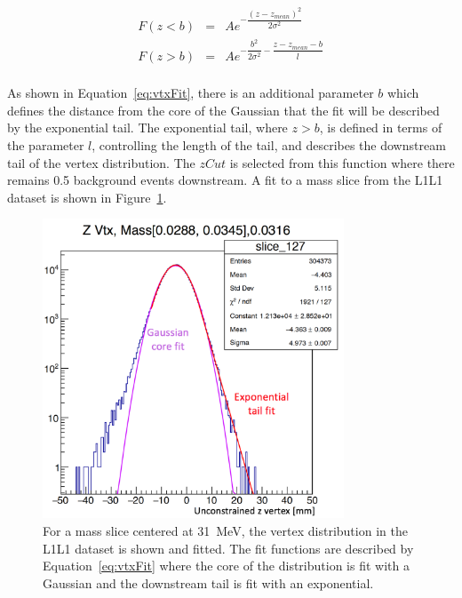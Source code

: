 \begin{eqnarray*}
\label{eq:vtxFit}
F(z < b) & = & Ae^{-\dfrac{(z-z_{mean})^2}{2\sigma^2}}\\
F(z > b) & = & Ae^{-\dfrac{b^2}{2\sigma^2}-\dfrac{z-z_{mean}-b}{l}}\\
\end{eqnarray*}

As shown in Equation~\eqref{eq:vtxFit}, there is an additional parameter $b$ which defines the distance from the core of the Gaussian that the fit will be described by the exponential tail. The exponential tail, where $z>b$, is defined in terms of the parameter $l$, controlling the length of the tail, and describes the downstream tail of the vertex distribution. The $zCut$ is selected from this function where there remains 0.5 background events downstream. A fit to a mass slice from the L1L1 dataset is shown in Figure~\ref{fig:vtxFitPic}.

\begin{figure}[H]
  \centering
      \includegraphics[width=0.8\textwidth]{pics/searching/vtxFit.png}
  \caption{For a mass slice centered at 31~MeV, the vertex distribution in the L1L1 dataset is shown and fitted. The fit functions are described by Equation~\eqref{eq:vtxFit} where the core of the distribution is fit with a Gaussian and the downstream tail is fit with an exponential.}
  \label{fig:vtxFitPic}
\end{figure} 

